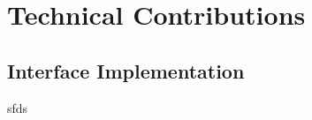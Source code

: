 \chapter{Technical Contributions}

\section{Interface Implementation}\label{interface-implementation}

sfds
